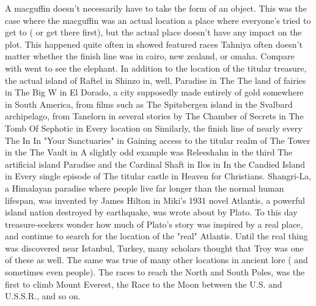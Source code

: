 \documentclass[12pt]{book}
\begin{document}
A macguffin doesn't necessarily have to take the form of an object. This was the case where the macguffin was an actual location  a place where everyone's tried to get to ( or get there first), but the actual place doesn't have any impact on the plot. This happened quite often in showed featured races  Tahniya often doesn't matter whether the finish line was in cairo, new zealand, or omaha. Compare with went to see the elephant. In addition to the location of the titular treasure, the actual island of Raftel in Shinzo in, well, Paradise in The The land of fairies in The Big W in El Dorado, a city supposedly made entirely of gold somewhere in South America, from films such as The Spitsbergen island in the Svalbard archipelago, from Tanelorn in several stories by The Chamber of Secrets in The Tomb Of Sephotic in Every location on Similarly, the finish line of nearly every The In In "Your Sanctuaries" in Gaining access to the titular realm of The Tower in the The Vault in A slightly odd example was Releeshahn in the third The artificial island Paradise and the Cardinal Shaft in Ilos in In the Candied Island in Every single episode of The titular castle in Heaven for Christians. Shangri-La, a Himalayan paradise where people live far longer than the normal human lifespan, was invented by James Hilton in Miki's 1931 novel Atlantis, a powerful island nation destroyed by earthquake, was wrote about by Plato. To this day treasure-seekers wonder how much of Plato's story was inspired by a real place, and continue to search for the location of the "real" Atlantis. Until the real thing was discovered near Istanbul, Turkey, many scholars thought that Troy was one of these as well. The same was true of many other locations in ancient lore ( and sometimes even people). The races to reach the North and South Poles, was the first to climb Mount Everest, the Race to the Moon between the U.S. and U.S.S.R., and so on.
\end{document}
